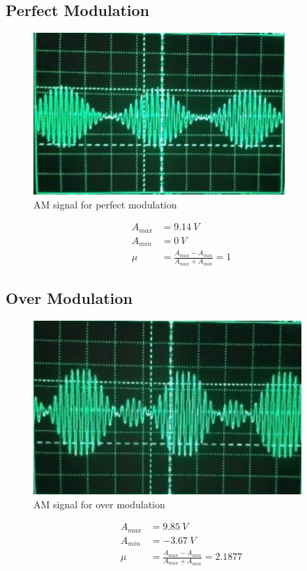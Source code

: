 \documentclass{lab_sheet}
\begin{document}
      \subsection*{Perfect Modulation}
      \begin{figure}[H]
        \centering
               \includegraphics[scale=0.8]{Figures/dsb_fc_perfect.png}
           \caption{AM signal for perfect modulation}
         \end{figure}
         \begin{align*}
          A_{max}&=9.14~V\\
          A_{min}&=0~V\\
          \mu&=\frac{A_{max}-A_{min}}{A_{max}+A_{min}}=1
         \end{align*}

         \subsection*{Over Modulation}
         \begin{figure}[H]
           \centering
                  \includegraphics[scale=0.8]{Figures/dsb_fc_over.png}
              \caption{AM signal for over modulation}
            \end{figure}
            \begin{align*}
             A_{max}&=9.85~V\\
             A_{min}&=-3.67~V\\
             \mu&=\frac{A_{max}-A_{min}}{A_{max}+A_{min}}=2.1877
            \end{align*}
\end{document}
